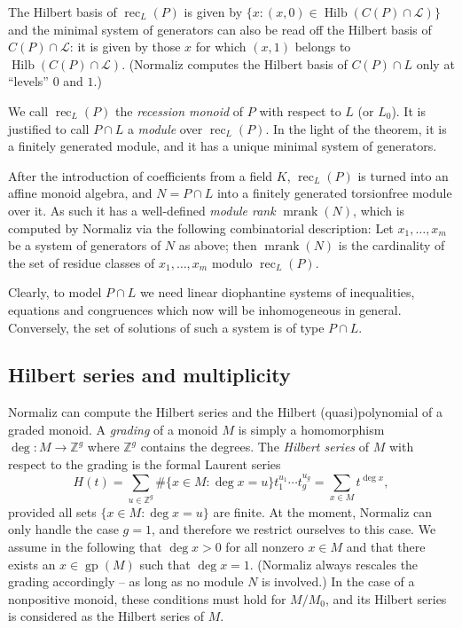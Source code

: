 \documentclass[12pt,a4paper]{scrartcl}
\theoremstyle{definition}
\def\ZZ{{\mathbb Z}}
\def\cL{{\mathcal L}}
\DeclareMathOperator{\gp}{gp}
\DeclareMathOperator{\rec}{rec}
\DeclareMathOperator{\mrank}{mrank}
\DeclareMathOperator{\Hilb}{Hilb}
\begin{document}
The Hilbert basis of $\rec_L(P)$ is given by $\{x: (x,0)\in \Hilb(C(P)\cap\cL)\}$ and the minimal system of generators can also be read off the Hilbert basis of $C(P)\cap \cL$: it is given by those $x$ for which $(x,1)$ belongs to $\Hilb(C(P)\cap\cL)$. (Normaliz computes the Hilbert basis of $C(P)\cap L$ only at ``levels'' $0$ and $1$.)

We call $\rec_L(P)$ the \emph{recession monoid} of $P$ with respect to $L$ (or $L_0$). It is justified to call $P\cap L$ a \emph{module} over $\rec_L(P)$. In the light of the theorem, it is a finitely generated module, and it has a unique minimal system of generators.

After the introduction of coefficients from a field $K$, $\rec_L(P)$ is turned into an affine monoid algebra, and $N=P\cap L$ into a finitely generated torsionfree module over it. As such it has a well-defined \emph{module rank} $\mrank(N)$, which is computed by Normaliz via the following combinatorial description: Let $x_1,\dots,x_m$ be a system of generators of $N$ as above; then $\mrank(N)$  is the cardinality of the set of residue classes of $x_1,\dots,x_m$ modulo $\rec_L(P)$.

Clearly, to model $P\cap L$ we need linear diophantine systems of inequalities, equations and congruences which now will be inhomogeneous in general. Conversely, the set of solutions of such a system is of type $P\cap L$.


\subsection{Hilbert series and multiplicity}\label{AppHilbertSeries}

Normaliz can compute the Hilbert series  and the Hilbert
(quasi)polynomial of a graded monoid. A \emph{grading} of a
monoid $M$ is simply a homomorphism $\deg:M\to\ZZ^g$ where
$\ZZ^g$ contains the degrees. The \emph{Hilbert series} of $M$
with respect to the grading is the formal Laurent series
$$
H(t)=\sum_{u\in \ZZ^g} \#\{x\in M: \deg x=u\}t_1^{u_1}\cdots t_g^{u_g}=\sum_{x\in M}t^{\deg x},
$$
provided all sets $\{x\in M: \deg x=u\}$ are finite. At the moment, Normaliz can only handle the case $g=1$, and therefore we restrict ourselves to this case. We assume in the following that $\deg x >0$ for all nonzero $x\in M$ and that there exists an $x\in\gp(M)$ such that $\deg x=1$. (Normaliz always rescales the grading accordingly -- as long as no module $N$ is involved.) In the case of a nonpositive monoid, these conditions must hold for $M/M_0$, and its Hilbert series is considered as the Hilbert series of $M$. 
\end{document}
